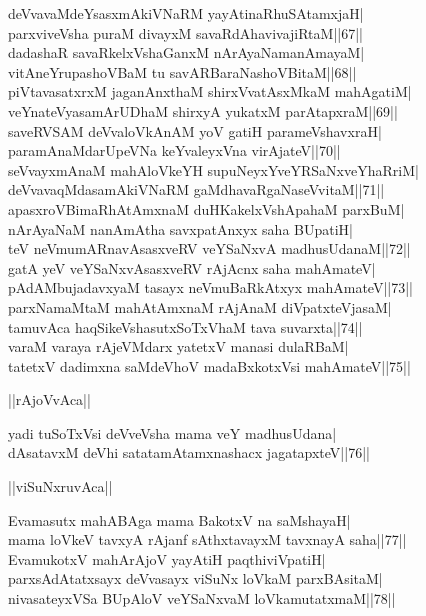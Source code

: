 \documentclass{article}
\begin{document}
deVvavaMdeYsasxmAkiVNaRM yayAtinaRhuSAtamxjaH|\\
parxviveVsha puraM divayxM savaRdAhavivajiRtaM||67||\\
dadashaR savaRkelxVshaGanxM nArAyaNamanAmayaM|\\
vitAneYrupashoVBaM tu savARBaraNashoVBitaM||68||\\
piVtavasatxrxM jaganAnxthaM shirxVvatAsxMkaM mahAgatiM|\\
veYnateVyasamArUDhaM shirxyA yukatxM parAtapxraM||69||\\
saveRVSAM deVvaloVkAnAM yoV gatiH parameVshavxraH|\\
paramAnaMdarUpeVNa keYvaleyxVna virAjateV||70||\\
seVvayxmAnaM mahAloVkeYH supuNeyxYveYRSaNxveYhaRriM|\\
deVvavaqMdasamAkiVNaRM gaMdhavaRgaNaseVvitaM||71||\\
apasxroVBimaRhAtAmxnaM duHKakelxVshApahaM parxBuM|\\
nArAyaNaM nanAmAtha savxpatAnxyx saha BUpatiH|\\
teV neVmumARnavAsasxveRV veYSaNxvA madhusUdanaM||72||\\
gatA yeV veYSaNxvAsasxveRV rAjAcnx saha mahAmateV|\\
pAdAMbujadavxyaM tasayx neVmuBaRkAtxyx mahAmateV||73||\\
parxNamaMtaM mahAtAmxnaM rAjAnaM diVpatxteVjasaM|\\
tamuvAca haqSikeVshasutxSoTxVhaM tava suvarxta||74||\\
varaM varaya rAjeVMdarx yatetxV manasi dulaRBaM|\\
tatetxV dadimxna saMdeVhoV madaBxkotxVsi mahAmateV||75||\\

\begin{center}
||rAjoVvAca||
\end{center}

yadi tuSoTxVsi deVveVsha mama veY madhusUdana|\\
dAsatavxM deVhi satatamAtamxnashacx jagatapxteV||76||\\

\begin{center}
||viSuNxruvAca||
\end{center}

Evamasutx mahABAga mama BakotxV na saMshayaH|\\
mama loVkeV tavxyA rAjanf sAthxtavayxM tavxnayA saha||77||\\
EvamukotxV mahArAjoV yayAtiH paqthiviVpatiH|\\
parxsAdAtatxsayx deVvasayx viSuNx loVkaM parxBAsitaM|\\
nivasateyxVSa BUpAloV veYSaNxvaM loVkamutatxmaM||78||\\
\end{document}
